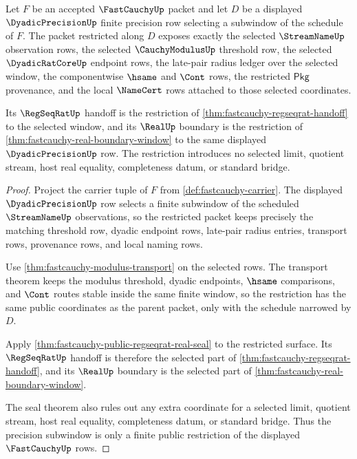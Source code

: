 \begin{theorem}
\label{thm:fastcauchy-precision-window-restriction}
Let $F$ be an accepted $\FastCauchyUp$ packet and let $D$ be a displayed
$\DyadicPrecisionUp$ finite precision row selecting a subwindow of the schedule
of $F$. The packet restricted along $D$ exposes exactly the selected
$\StreamNameUp$ observation rows, the selected $\CauchyModulusUp$ threshold
row, the selected $\DyadicRatCoreUp$ endpoint rows, the late-pair radius ledger
over the selected window, the componentwise $\hsame$ and $\Cont$ rows, the
restricted $\mathsf{Pkg}$ provenance, and the local $\NameCert$ rows attached to
those selected coordinates.

Its $\RegSeqRatUp$ handoff is the restriction of
\autoref{thm:fastcauchy-regseqrat-handoff} to the selected window, and its
$\RealUp$ boundary is the restriction of
\autoref{thm:fastcauchy-real-boundary-window} to the same displayed
$\DyadicPrecisionUp$ row. The restriction introduces no selected limit, quotient
stream, host real equality, completeness datum, or standard bridge.
\end{theorem}
\begin{proof}
Project the carrier tuple of $F$ from \autoref{def:fastcauchy-carrier}. The
displayed $\DyadicPrecisionUp$ row selects a finite subwindow of the scheduled
$\StreamNameUp$ observations, so the restricted packet keeps precisely the
matching threshold row, dyadic endpoint rows, late-pair radius entries,
transport rows, provenance rows, and local naming rows.

Use \autoref{thm:fastcauchy-modulus-transport} on the selected rows. The
transport theorem keeps the modulus threshold, dyadic endpoints, $\hsame$
comparisons, and $\Cont$ routes stable inside the same finite window, so the
restriction has the same public coordinates as the parent packet, only with the
schedule narrowed by $D$.

Apply \autoref{thm:fastcauchy-public-regseqrat-real-seal} to the restricted
surface. Its $\RegSeqRatUp$ handoff is therefore the selected part of
\autoref{thm:fastcauchy-regseqrat-handoff}, and its $\RealUp$ boundary is the
selected part of \autoref{thm:fastcauchy-real-boundary-window}.

The seal theorem also rules out any extra coordinate for a selected limit,
quotient stream, host real equality, completeness datum, or standard bridge.
Thus the precision subwindow is only a finite public restriction of the
displayed $\FastCauchyUp$ rows.
\end{proof}

